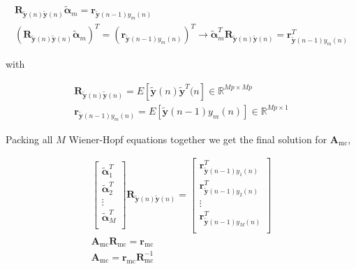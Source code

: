 \begin{eqnarray}
	\boldsymbol{R}_{\boldsymbol{\tilde{y}}(n)\boldsymbol{\tilde{y}}(n)} \boldsymbol{\tilde{\alpha}}_m =
	\boldsymbol{r}_{\boldsymbol{\tilde{y}}(n-1)y_m(n)}  \\
	(\boldsymbol{R}_{\boldsymbol{\tilde{y}}(n)\boldsymbol{\tilde{y}}(n)} \boldsymbol{\tilde{\alpha}}_m)^T =
	(\boldsymbol{r}_{\boldsymbol{\tilde{y}}(n-1)y_m(n)})^T \rightarrow
	\boldsymbol{\tilde{\alpha}}^T_m  \boldsymbol{R}_{\boldsymbol{\tilde{y}}(n)\boldsymbol{\tilde{y}}(n)} =  \boldsymbol{r}^T_{\boldsymbol{\tilde{y}}(n-1)y_m(n)} %
\end{eqnarray}

\noindent
with

\begin{eqnarray}
	\boldsymbol{R}_{\boldsymbol{\tilde{y}}(n)\boldsymbol{\tilde{y}}(n)} = E[\boldsymbol{\tilde{y}}(n) \boldsymbol{\tilde{y}}^T(n] \in  \mathbb{R} ^ {Mp \times Mp}\\
	\boldsymbol{r}_{\boldsymbol{\tilde{y}}(n-1)y_m(n)} = E[\boldsymbol{\tilde{y}}(n-1)y_m(n)] \in  \mathbb{R} ^ {Mp \times 1}
\end{eqnarray}

Packing all $M$ Wiener-Hopf equations together we get the final solution for $\boldsymbol{A}_{\mathrm{mc}}$,

\begin{eqnarray}
	\begin{bmatrix}
		\boldsymbol{\tilde{\alpha}}^T_1 \\
		\boldsymbol{\tilde{\alpha}}^T_2 \\
		\vdots \\
		\boldsymbol{\tilde{\alpha}}^T_M \\
	\end{bmatrix}
	\boldsymbol{R}_{\boldsymbol{\tilde{y}}(n)\boldsymbol{\tilde{y}}(n)} =
	\begin{bmatrix}
		\boldsymbol{r}^T_{\boldsymbol{\tilde{y}}(n-1)y_1(n)} \\
		\boldsymbol{r}^T_{\boldsymbol{\tilde{y}}(n-1)y_2(n)}\\
		\vdots \\
		\boldsymbol{r}^T_{\boldsymbol{\tilde{y}}(n-1)y_M(n)} \\
	\end{bmatrix} \\
	\boldsymbol{A}_{\mathrm{mc}}\boldsymbol{R}_{\mathrm{mc}} = \boldsymbol{r}_{\mathrm{mc}} \label{eq:mc_yule_walker} \\
	\boldsymbol{A}_{\mathrm{mc}} = \boldsymbol{r}_{\mathrm{mc}} \boldsymbol{R}_{\mathrm{mc}}^{-1}
\end{eqnarray}

